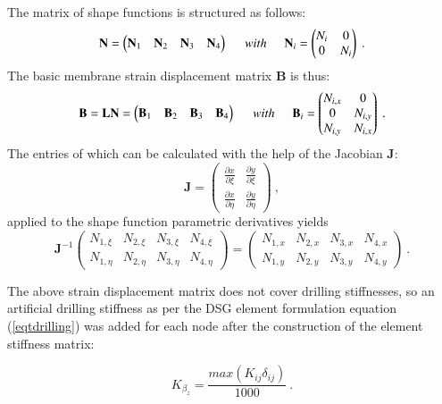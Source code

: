 The matrix of shape functions is structured as follows:
\begin{equation}
\mathbf{N}=  \begin{pmatrix}
\mathbf{N}_1 & \mathbf{N}_2 & \mathbf{N}_3 & \mathbf{N}_4
\end{pmatrix}
\hspace{5mm}
with
\hspace{5mm}
\mathbf{N}_i=  \begin{pmatrix}
{N}_i & 0\\
0& N_i
\end{pmatrix}
\label{eqApp1_4}\ .
\end{equation}
The basic membrane strain displacement matrix $\mathbf{B}$ is thus:
\begin{equation}
\mathbf{B}=  \mathbf{L} \mathbf{N} = \begin{pmatrix}
\mathbf{B}_1 & \mathbf{B}_2 & \mathbf{B}_3 & \mathbf{B}_4
\end{pmatrix}
\hspace{5mm}
with
\hspace{5mm}
\mathbf{B}_i=  \begin{pmatrix}
{N}_{i,x} & 0\\
0& {N}_{i,y}\\
{N}_{i,y} & {N}_{i,x}
\end{pmatrix}
\label{eqApp1_5}\ .
\end{equation}
The entries of which can be calculated with the help of the Jacobian $\mathbf{J}$:
\begin{equation}
\mathbf{J}=  \begin{pmatrix}
\frac{\partial x}{\partial \xi} & \frac{\partial y}{\partial \xi} \\
\frac{\partial x}{\partial \eta} & \frac{\partial y}{\partial \eta}
\end{pmatrix}
\label{eqApp1_6}\ ,
\end{equation}
applied to the shape function parametric derivatives yields
\begin{equation}
\mathbf{J}^{-1} 
\begin{pmatrix}
{N}_{1,\xi} & {N}_{2,\xi} & {N}_{3,\xi} & {N}_{4,\xi}\\
{N}_{1,\eta} & {N}_{2,\eta} & {N}_{3,\eta} & {N}_{4,\eta}
\end{pmatrix}
=
\begin{pmatrix}
{N}_{1,x} & {N}_{2,x} & {N}_{3,x} & {N}_{4,x}\\
{N}_{1,y} & {N}_{2,y} & {N}_{3,y} & {N}_{4,y}
\end{pmatrix}
\label{eqApp1_7}\ .
\end{equation}

The above strain displacement matrix does not cover drilling stiffnesses, so an artificial drilling stiffness as per the DSG element formulation equation (\ref{eqtdrilling}) was added for each node after the construction of the element stiffness matrix:

\begin{equation} 
K_{\beta_z} =  \frac{max(K_{ij}\delta_{ij})}{1000}
\label{eqtdrilling1}\ .
\end{equation}